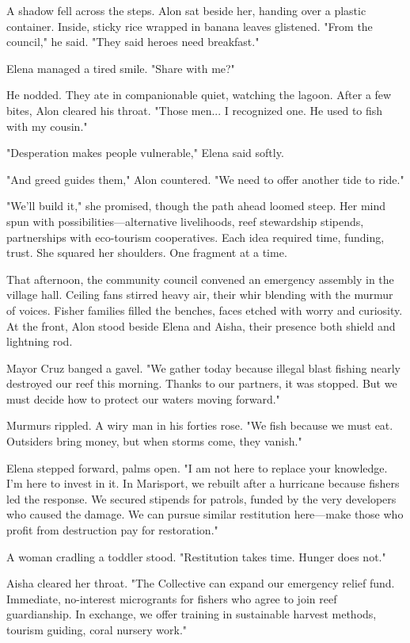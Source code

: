 A shadow fell across the steps. Alon sat beside her, handing over a plastic container. Inside, sticky rice wrapped in banana leaves glistened. "From the council," he said. "They said heroes need breakfast."

Elena managed a tired smile. "Share with me?"

He nodded. They ate in companionable quiet, watching the lagoon. After a few bites, Alon cleared his throat. "Those men... I recognized one. He used to fish with my cousin."

"Desperation makes people vulnerable," Elena said softly.

"And greed guides them," Alon countered. "We need to offer another tide to ride."

"We'll build it," she promised, though the path ahead loomed steep. Her mind spun with possibilities—alternative livelihoods, reef stewardship stipends, partnerships with eco-tourism cooperatives. Each idea required time, funding, trust. She squared her shoulders. One fragment at a time.

\bigskip

That afternoon, the community council convened an emergency assembly in the village hall. Ceiling fans stirred heavy air, their whir blending with the murmur of voices. Fisher families filled the benches, faces etched with worry and curiosity. At the front, Alon stood beside Elena and Aisha, their presence both shield and lightning rod.

Mayor Cruz banged a gavel. "We gather today because illegal blast fishing nearly destroyed our reef this morning. Thanks to our partners, it was stopped. But we must decide how to protect our waters moving forward."

Murmurs rippled. A wiry man in his forties rose. "We fish because we must eat. Outsiders bring money, but when storms come, they vanish."

Elena stepped forward, palms open. "I am not here to replace your knowledge. I'm here to invest in it. In Marisport, we rebuilt after a hurricane because fishers led the response. We secured stipends for patrols, funded by the very developers who caused the damage. We can pursue similar restitution here—make those who profit from destruction pay for restoration."

A woman cradling a toddler stood. "Restitution takes time. Hunger does not."

Aisha cleared her throat. "The Collective can expand our emergency relief fund. Immediate, no-interest microgrants for fishers who agree to join reef guardianship. In exchange, we offer training in sustainable harvest methods, tourism guiding, coral nursery work."

